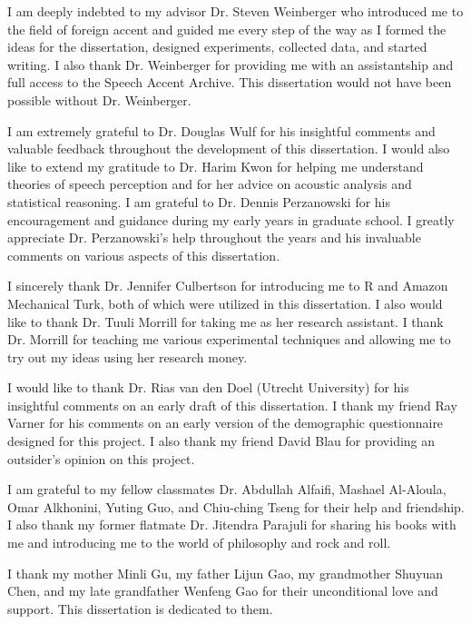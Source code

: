 \documentclass[11 pt]{report}
\begin{document}
\bigskip

\noindent I am deeply indebted to my advisor Dr. Steven Weinberger who introduced me to the field of foreign accent and guided me every step of the way as I formed the ideas for the dissertation, designed experiments, collected data, and started writing. I also thank Dr. Weinberger for providing me with an assistantship and full access to the Speech Accent Archive. This dissertation would not have been possible without Dr. Weinberger. 

\bigskip

\noindent I am extremely grateful to Dr. Douglas Wulf for his insightful comments and valuable feedback throughout the development of this dissertation. I would also like to extend my gratitude to Dr. Harim Kwon for helping me understand theories of speech perception and for her advice on acoustic analysis and statistical reasoning. I am grateful to Dr. Dennis Perzanowski for his encouragement and guidance during my early years in graduate school. I greatly appreciate Dr. Perzanowski’s help throughout the years and his invaluable comments on various aspects of this dissertation.

\bigskip

\noindent I sincerely thank Dr. Jennifer Culbertson for introducing me to R and Amazon Mechanical Turk, both of which were utilized in this dissertation. I also would like to thank Dr. Tuuli Morrill for taking me as her research assistant. I thank Dr. Morrill for teaching me various experimental techniques and allowing me to try out my ideas using her research money.   

\bigskip

\noindent I would like to thank Dr. Rias van den Doel (Utrecht University) for his insightful comments on an early draft of this dissertation. I thank my friend Ray Varner for his comments on an early version of the demographic questionnaire designed for this project. I also thank my friend David Blau for providing an outsider's opinion on this project.

\bigskip

\noindent I am grateful to my fellow classmates Dr. Abdullah Alfaifi, Mashael Al-Aloula, Omar Alkhonini, Yuting Guo, and Chiu-ching Tseng for their help and friendship. I also thank my former flatmate Dr. Jitendra Parajuli for sharing his books with me and introducing me to the world of philosophy and rock and roll. 

\bigskip

\noindent I thank my mother Minli Gu, my father Lijun Gao, my grandmother Shuyuan Chen, and my late grandfather Wenfeng Gao for their unconditional love and support. This dissertation is dedicated to them.
\end{document}
